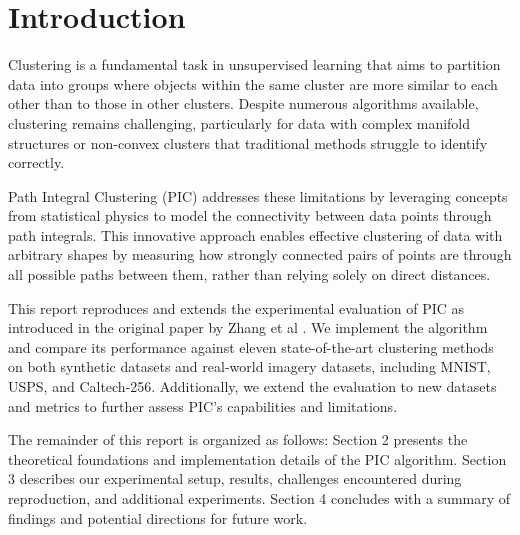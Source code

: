 \section{Introduction}
Clustering is a fundamental task in unsupervised learning that aims to partition data into groups where objects within the same cluster are more similar to each other than to those in other clusters. Despite numerous algorithms available, clustering remains challenging, particularly for data with complex manifold structures or non-convex clusters that traditional methods struggle to identify correctly.

Path Integral Clustering (PIC) \cite{PIC} addresses these limitations by leveraging concepts from statistical physics to model the connectivity between data points through path integrals. This innovative approach enables effective clustering of data with arbitrary shapes by measuring how strongly connected pairs of points are through all possible paths between them, rather than relying solely on direct distances.

This report reproduces and extends the experimental evaluation of PIC as introduced in the original paper by Zhang et al \cite{PIC}. We implement the algorithm and compare its performance against eleven state-of-the-art clustering methods on both synthetic datasets and real-world imagery datasets, including MNIST, USPS, and Caltech-256. Additionally, we extend the evaluation to new datasets and metrics to further assess PIC's capabilities and limitations.

The remainder of this report is organized as follows: Section 2 presents the theoretical foundations and implementation details of the PIC algorithm. Section 3 describes our experimental setup, results, challenges encountered during reproduction, and additional experiments. Section 4 concludes with a summary of findings and potential directions for future work.